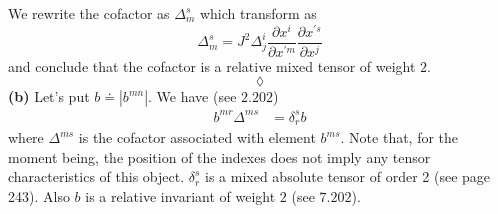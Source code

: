 We rewrite the cofactor as $\Delta^{s}_{m}$ which transform as $$\Delta^{s}_{m}= J^2 \Delta^{i}_{j}\frac{\partial x^{i} }{\partial {x^{'m}}}\frac{\partial x^{'s} }{\partial x^{j}}$$
and conclude that the cofactor is a relative mixed tensor of weight $2$.
$$\lozenge$$
\textbf{(b)}
Let's put $b \doteq \left|b^{mn}\right|$. We have (see $\mathbf{2.202}$)
\begin{align}
b^{mr}_{}\Delta^{ms}&=\delta^s_r b
\end{align}
where $\Delta^{ms}$ is the cofactor associated with element $b^{ms}$. Note that, for the moment being, the position of the indexes does not imply any tensor characteristics of this object.
$\delta^s_r$ is a mixed absolute tensor of order 2 (see page 243).
Also $b$ is a relative invariant of weight $2$ (see $\mathbf{7.202}$).\\

